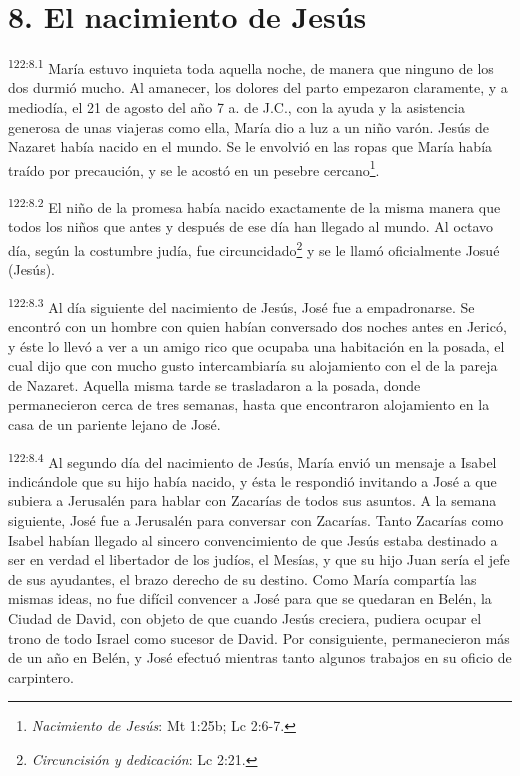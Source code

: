 \section*{8. El nacimiento de Jesús}
\par
\textsuperscript{122:8.1} María estuvo inquieta toda aquella noche, de manera que ninguno de los dos durmió mucho. Al amanecer, los dolores del parto empezaron claramente, y a mediodía, el 21 de agosto del año 7 a. de J.C., con la ayuda y la asistencia generosa de unas viajeras como ella, María dio a luz a un niño varón. Jesús de Nazaret había nacido en el mundo. Se le envolvió en las ropas que María había traído por precaución, y se le acostó en un pesebre cercano\footnote{\textit{Nacimiento de Jesús}: Mt 1:25b; Lc 2:6-7.}.

\par
\textsuperscript{122:8.2} El niño de la promesa había nacido exactamente de la misma manera que todos los niños que antes y después de ese día han llegado al mundo. Al octavo día, según la costumbre judía, fue circuncidado\footnote{\textit{Circuncisión y dedicación}: Lc 2:21.} y se le llamó oficialmente Josué (Jesús).

\par
\textsuperscript{122:8.3} Al día siguiente del nacimiento de Jesús, José fue a empadronarse. Se encontró con un hombre con quien habían conversado dos noches antes en Jericó, y éste lo llevó a ver a un amigo rico que ocupaba una habitación en la posada, el cual dijo que con mucho gusto intercambiaría su alojamiento con el de la pareja de Nazaret. Aquella misma tarde se trasladaron a la posada, donde permanecieron cerca de tres semanas, hasta que encontraron alojamiento en la casa de un pariente lejano de José.

\par
\textsuperscript{122:8.4} Al segundo día del nacimiento de Jesús, María envió un mensaje a Isabel indicándole que su hijo había nacido, y ésta le respondió invitando a José a que subiera a Jerusalén para hablar con Zacarías de todos sus asuntos. A la semana siguiente, José fue a Jerusalén para conversar con Zacarías. Tanto Zacarías como Isabel habían llegado al sincero convencimiento de que Jesús estaba destinado a ser en verdad el libertador de los judíos, el Mesías, y que su hijo Juan sería el jefe de sus ayudantes, el brazo derecho de su destino. Como María compartía las mismas ideas, no fue difícil convencer a José para que se quedaran en Belén, la Ciudad de David, con objeto de que cuando Jesús creciera, pudiera ocupar el trono de todo Israel como sucesor de David. Por consiguiente, permanecieron más de un año en Belén, y José efectuó mientras tanto algunos trabajos en su oficio de carpintero.

